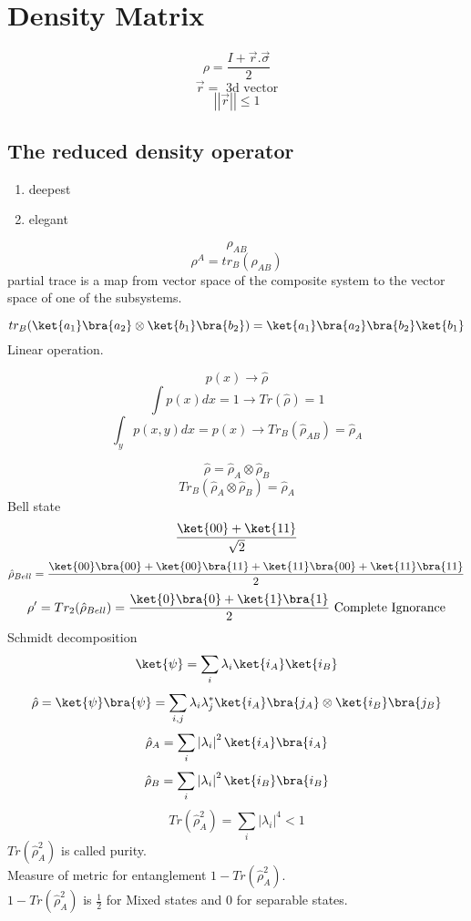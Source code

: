 \chapter{Density Matrix}

\[
    \rho = \frac{I + \vec{r}.\vec{\sigma}}{2}
\]
\[
    \vec{r} = \text{ 3d vector}
\]
\[
    \left\vert \left\vert \vec{r} \right\vert  \right\vert \leq 1
\]
\section{The reduced density operator}
\begin{enumerate}
    \item deepest
    \item elegant 
\end{enumerate}
\[
    \rho_{AB} 
\]
\[
    \rho^A = tr_B(\rho_{AB} )
\]
partial trace is a map from vector space of the composite system to the vector space of one of the subsystems. 
\begin{definition}
    \[
        tr_B(\ket{a_1}\bra{a_2}\otimes \ket{b_1}\bra{b_2})= \ket{a_1}\bra{a_2}\bra{b_2}\ket{b_1}
    \]
    Linear operation. 
\end{definition}
\[
    p(x) \to \hat{\rho} 
\]
\[
    \int p(x)dx = 1 \to Tr(\hat{\rho} ) =1
\]
\[
    \int_y p(x,y) dx = p(x) \to Tr_B(\hat{\rho}_{AB} ) = \hat{\rho}_A 
\]

\[
    \hat{\rho} = \hat{\rho} _A \otimes \hat{\rho} _B
\]
\[
    Tr_B(\hat{\rho} _A \otimes \hat{\rho} _B) = \hat{\rho} _A
\]
Bell state
\[
    \frac{\ket{00}+\ket{11}}{\sqrt{2} }
\]
\[
    \hat{\rho} _{Bell}  = \frac{\ket{00}\bra{00}+\ket{00}\bra{11}+\ket{11}\bra{00}+\ket{11}\bra{11}}{2}
\]
\[
    \rho^\prime = Tr_2(\hat{\rho}_{Bell} )  = \frac{\ket{0}\bra{0}+\ket{1}\bra{1}}{2} \text{ Complete Ignorance}
\]
Schmidt decomposition 
\[
    \ket{\psi} = \sum\limits_{i} \lambda_i \ket{i_A}\ket{i_B}
\]
\[
    \hat{\rho} = \ket{\psi}\bra{\psi} = \sum\limits_{i,j}\lambda_i \lambda_j^* \ket{i_A}\bra{j_A}\otimes \ket{i_B}\bra{j_B}
\]
\[
    \hat{\rho} _A = \sum\limits_{i}\left\vert \lambda_i \right\vert ^2 \ket{i_A}\bra{i_A}
\]
\[
    \hat{\rho} _B = \sum\limits_{i}\left\vert \lambda_i \right\vert ^2 \ket{i_B}\bra{i_B}
\]
\[
    Tr(\hat{\rho} _{A}^{2}) = \sum_i \left\vert \lambda_i \right\vert ^4 < 1
\]
\(Tr(\hat{\rho} _{A}^{2})\) is called purity. \\
Measure of metric for entanglement \(1 - Tr(\hat{\rho} _{A}^{2})\).\\ 
\(1 - Tr(\hat{\rho} _{A}^{2})\) is \(\frac{1}{2}\) for Mixed states and 0 for separable states. 
